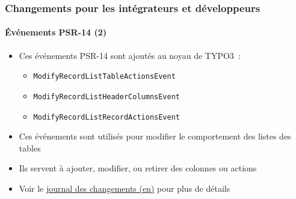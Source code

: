 %

\begin{frame}[fragile]
	\frametitle{Changements pour les intégrateurs et développeurs}
	\framesubtitle{Événements PSR-14 (2)}


	\begin{itemize}
		\item Ces événements PSR-14 sont ajoutés au noyau de TYPO3~:
			\begin{itemize}
				\item \texttt{ModifyRecordListTableActionsEvent}
				\item \texttt{ModifyRecordListHeaderColumnsEvent}
				\item \texttt{ModifyRecordListRecordActionsEvent}
			\end{itemize}
		\item Ces événements sont utilisés pour modifier le comportement des listes des tables
		\item Ils servent à ajouter, modifier, ou retirer des colonnes ou actions
		\item Voir le
			\href{https://docs.typo3.org/c/typo3/cms-core/master/en-us/Changelog/11.4/Feature-95105-NewPSR-14DatabaseRecordListEvents.html}{journal des changements (en)}
			pour plus de détails

	\end{itemize}
\end{frame}

